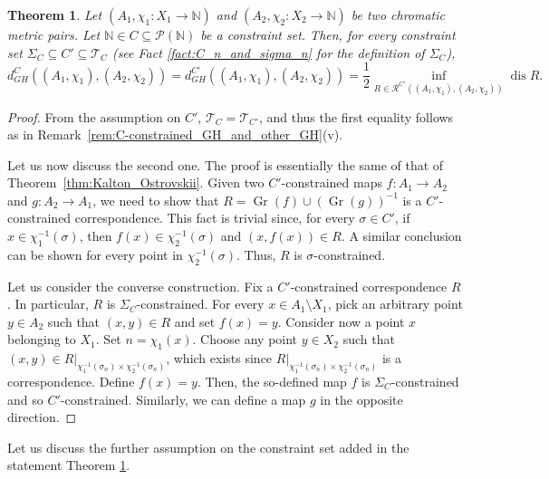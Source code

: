 \documentclass[8pt,a4paper,oneside,english,english]{article}
\theoremstyle{plain}
\theoremstyle
{plain}
\newtheorem{theorem}{Theorem}[section]
\theoremstyle{definition}
\newcommand{\N}{\mathbb{N}}
\newcommand{\Tau}{\mathcal T}
\newcommand{\GH}{d_{GH}}
\newcommand{\MP}[1]{(A_{#1},\chi_{#1})}
\newcommand{\extMP}[1]{(A_{#1},\chi_{#1}\colon X_{#1}\to\N)}
\DeclareMathOperator{\dis}{dis}
\DeclareMathOperator{\gr}{Gr}
\begin{document}
\begin{theorem}\label{thm:characterization_via_correspondences}
	Let $\extMP{1}$ and $\extMP{2}$ be two chromatic metric pairs. Let $\N\in C\subseteq\mathcal P(\N)$ be a constraint set.
    Then, for every constraint set $\Sigma_C\subseteq C'\subseteq\Tau_C$ (see Fact \ref{fact:C_n_and_sigma_n} for the definition of $\Sigma_C$),
	\[
	\GH^C(\MP{1},\MP{2})=\GH^{C'}(\MP{1},\MP{2})=\frac{1}{2}\inf_{R\in\mathcal R^{C'}(\MP{1},\MP{2})}\dis R.
	\]
\end{theorem}
\begin{proof}
    From the assumption on $C'$, $\Tau_C=\Tau_{C'}$, and thus the first equality follows as in 
    Remark~\ref{rem:C-constrained_GH_and_other_GH}(v). 
    
    Let us now discuss the second one. The proof is essentially the same of that of Theorem~\ref{thm:Kalton_Ostrovskii}. Given two $C'$-constrained maps $f\colon A_1\to A_2$ and $g\colon A_2\to A_1$, we need to show that $R=\gr(f)\cup(\gr(g))^{-1}$ is a $C'$-constrained correspondence. This fact is trivial since, for every $\sigma\in C'$, if $x\in\chi_1^{-1}(\sigma)$, then $f(x)\in\chi_2^{-1}(\sigma)$ and $(x,f(x))\in R$. A similar conclusion can be shown for every point in $\chi_2^{-1}(\sigma)$. Thus, $R$ is $\sigma$-constrained. 
	
	Let us consider the converse construction. 
    Fix a $C'$-constrained correspondence $R$. In particular, $R$ is $\Sigma_C$-constrained. For every $x\in A_1\setminus X_1$, pick an arbitrary point $y\in A_2$ such that $(x,y)\in R$ and set $f(x)=y$. Consider now a point $x$ belonging to $X_1$. Set $n=\chi_1(x)$. Choose any point $y\in X_2$ such that $(x,y)\in R|_{\chi_1^{-1}(\sigma_n)\times\chi_2^{-1}(\sigma_n)}$, which exists since $R|_{\chi_1^{-1}(\sigma_n)\times\chi_2^{-1}(\sigma_n)}$ is a correspondence. Define $f(x)=y$. Then, the so-defined map $f$ is $\Sigma_C$-constrained and so $C'$-constrained. Similarly, we can define a map $g$ in the opposite direction.
\end{proof}

Let us discuss the further assumption on the constraint set added in the statement Theorem \ref{thm:characterization_via_correspondences}.
\end{document}
